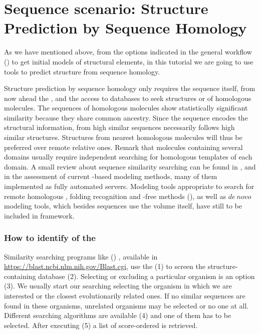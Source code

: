\section{Sequence scenario: Structure Prediction by Sequence Homology}

As we have mentioned above, from the options indicated in the general workflow () to get initial models of structural elements, in this tutorial we are going to use tools to predict structure from sequence homology. 

Structure prediction by sequence homology only requires the sequence itself, from now ahead the , and the access to databases to seek structures or  of homologous molecules. The sequences of homologous molecules show statistically significant similarity because they share common ancestry. Since the sequence encodes the structural information, from high similar sequences necessarily follows high similar structures. Structures from nearest homologous molecules will thus be preferred over remote relative ones. Remark that molecules containing several domains usually require independent searching for homologous templates of each domain. A small review about sequence similarity searching can be found in \citep{pearson2013}, and in \citep{kryshtafovych2018} the assessment of current -based modeling methods, many of them implemented as fully automated servers. Modeling tools appropriate to search for remote homologous , folding recognition and -free methods (), as well as $de\ novo$ modeling tools, which besides sequences use the volume itself, have still to be included in \scipion framework. 


\subsubsection*{How to identify  of the }
 Similarity searching programs like  () \citep{altschul1997}, available in \url{https://blast.ncbi.nlm.nih.gov/Blast.cgi}, use the  (1) to screen the structure-containing database  (2). Selecting or excluding a particular organism is an option (3). We usually start our searching selecting the organism in which we are interested or the closest evolutionarily related ones. If no similar sequences are found in these organisms, unrelated organisms may be selected or no one at all. Different searching algorithms are available (4) and one of them has to be selected. After executing  (5) a list of score-ordered  is retrieved. 
 
